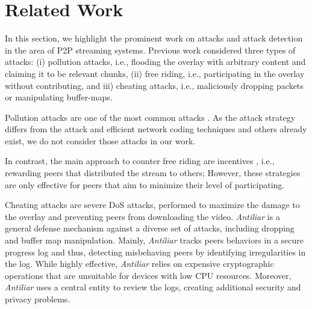 \section{Related Work}
\label{sec:related}

In this section, we highlight the prominent work on attacks and attack detection in the area of P2P streaming systems.
Previous work considered three types of attacks: (i) pollution attacks, i.e., flooding the overlay with arbitrary content and claiming it to be relevant chunks, (ii) free riding, i.e., participating in the overlay without contributing, and iii) cheating attacks, i.e., maliciously dropping packets or manipulating buffer-maps. 

Pollution attacks are one of the most common attacks \cite{pollution1}. 
As the attack strategy differs from the \drop attack and efficient network coding techniques \cite{nc} and others \cite{pollution2} already exist, we do not consider those attacks in our work.

In contrast, the main approach to counter free riding are incentives \cite{defending,defending2}, i.e., rewarding peers that distributed the stream to others; 
However, these strategies are only effective for peers that aim to minimize their level of participating. 

Cheating attacks are severe DoS attacks, performed to maximize the damage to the overlay and preventing peers from downloading the video.   
\textit{Antiliar} is a general defense mechanism against a diverse set of attacks, including dropping and buffer map manipulation\cite{antiliar}.
Mainly, \textit{Antiliar} tracks peers behaviors in a secure progress log and thus, detecting misbehaving peers by identifying irregularities in the log. 
While highly effective, \textit{Antiliar} relies on expensive cryptographic operations that are unsuitable for devices with low CPU resources.
Moreover, \textit{Antiliar} uses a central entity to review the logs, creating additional security and privacy problems. 

